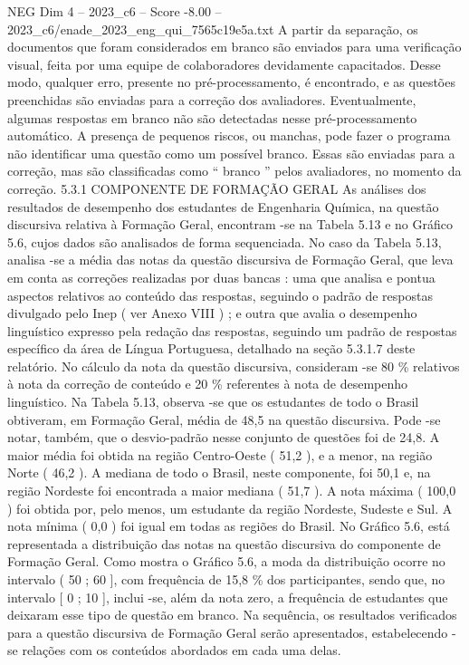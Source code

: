 \begin{textsample}{NEG Dim 4 – 2023\_c6 – Score -8.00 – 2023\_c6/enade\_2023\_eng\_qui\_7565c19e5a.txt}
A partir da separação, os documentos que foram considerados em branco são enviados para uma verificação visual, feita por uma equipe de colaboradores devidamente capacitados.
Desse modo, qualquer erro, presente no pré-processamento, é encontrado, e as questões preenchidas são enviadas para a correção dos avaliadores.
Eventualmente, algumas respostas em branco não são detectadas nesse pré-processamento automático.
A presença de pequenos riscos, ou manchas, pode fazer o programa não identificar uma questão como um possível branco.
Essas são enviadas para a correção, mas são classificadas como “ branco ” pelos avaliadores, no momento da correção. 5.3.1 COMPONENTE DE FORMAÇÃO GERAL As análises dos resultados de desempenho dos estudantes de Engenharia Química, na questão discursiva relativa à Formação Geral, encontram -se na Tabela 5.13 e no Gráfico 5.6, cujos dados são analisados de forma sequenciada.
No caso da Tabela 5.13, analisa -se a média das notas da questão discursiva de Formação Geral, que leva em conta as correções realizadas por duas bancas : uma que analisa e pontua aspectos relativos ao conteúdo das respostas, seguindo o padrão de respostas divulgado pelo Inep ( ver Anexo VIII ) ; e outra que avalia o desempenho linguístico expresso pela redação das respostas, seguindo um padrão de respostas específico da área de Língua Portuguesa, detalhado na seção 5.3.1.7 deste relatório.
No cálculo da nota da questão discursiva, consideram -se 80 \% relativos à nota da correção de conteúdo e 20 \% referentes à nota de desempenho linguístico.
Na Tabela 5.13, observa -se que os estudantes de todo o Brasil obtiveram, em Formação Geral, média de 48,5 na questão discursiva.
Pode -se notar, também, que o desvio-padrão nesse conjunto de questões foi de 24,8.
A maior média foi obtida na região Centro-Oeste ( 51,2 ), e a menor, na região Norte ( 46,2 ).
A mediana de todo o Brasil, neste componente, foi 50,1 e, na região Nordeste foi encontrada a maior mediana ( 51,7 ).
A nota máxima ( 100,0 ) foi obtida por, pelo menos, um estudante da região Nordeste, Sudeste e Sul.
A nota mínima ( 0,0 ) foi igual em todas as regiões do Brasil.
No Gráfico 5.6, está representada a distribuição das notas na questão discursiva do componente de Formação Geral.
Como mostra o Gráfico 5.6, a moda da distribuição ocorre no intervalo ( 50 ; 60 ], com frequência de 15,8 \% dos participantes, sendo que, no intervalo [ 0 ; 10 ], inclui -se, além da nota zero, a frequência de estudantes que deixaram esse tipo de questão em branco.
Na sequência, os resultados verificados para a questão discursiva de Formação Geral serão apresentados, estabelecendo -se relações com os conteúdos abordados em cada uma delas.

\end{textsample}
